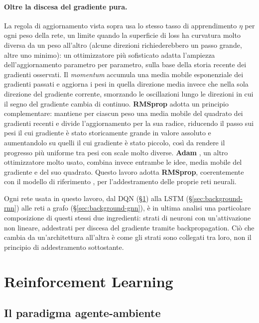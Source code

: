 \paragraph{Oltre la discesa del gradiente pura.} La regola di
aggiornamento vista sopra usa lo stesso tasso di apprendimento $\eta$ per
ogni peso della rete, un limite quando la superficie di loss ha curvatura
molto diversa da un peso all'altro (alcune direzioni richiederebbero un
passo grande, altre uno minimo): un ottimizzatore più sofisticato adatta
l'ampiezza dell'aggiornamento parametro per parametro, sulla base della
storia recente dei gradienti osservati.
Il \emph{momentum} \citep{qian1999momentum} accumula una
media mobile esponenziale dei gradienti passati e aggiorna i pesi in quella
direzione media invece che nella sola direzione del gradiente corrente,
smorzando le oscillazioni lungo le direzioni in cui il segno del gradiente
cambia di continuo. \textbf{RMSprop} \citep{tieleman2012rmsprop} adotta un
principio complementare: mantiene per ciascun peso una media mobile del
quadrato dei gradienti recenti e divide l'aggiornamento per la sua radice,
riducendo il passo sui pesi il cui gradiente è stato storicamente grande in
valore assoluto e aumentandolo su quelli il cui gradiente è stato piccolo,
così da rendere il progresso più uniforme tra pesi con scale molto diverse.
\textbf{Adam} \citep{kingma2015adam}, un altro ottimizzatore molto usato, combina invece entrambe le idee, media mobile
del gradiente e del suo quadrato. Questo lavoro
adotta \textbf{RMSprop}, coerentemente con il modello di riferimento
\citep{wang2022metastgat}, per l'addestramento delle proprie reti neurali.

Ogni rete usata in questo lavoro, dal DQN (§\ref{sec:background-rl}) alla
LSTM (§\ref{sec:background-rnn}) alle reti a grafo
(§\ref{sec:background-gnn}), è in ultima analisi una particolare
composizione di questi stessi due ingredienti: strati di neuroni con
un'attivazione non lineare, addestrati per discesa del gradiente tramite
backpropagation. Ciò che cambia da un'architettura all'altra è come gli
strati sono collegati tra loro, non il principio di addestramento
sottostante.

\section{Reinforcement Learning}
\label{sec:background-rl}

\subsection{Il paradigma agente-ambiente}


